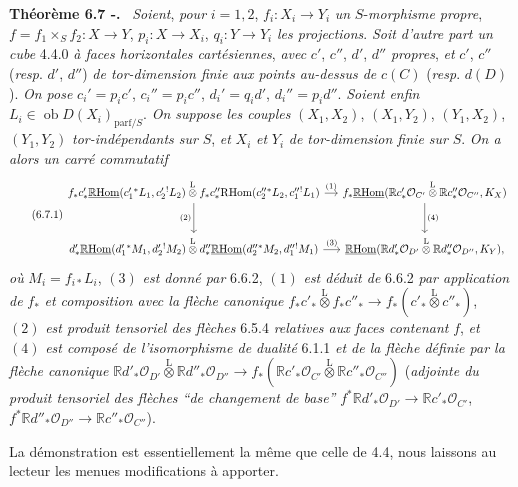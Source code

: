 \documentclass[11pt]{article}
\providecommand{\cO}{\mathcal{O}}
\newenvironment{statement}[1]{\par\medskip\noindent\textbf{#1.}\ }{\par\medskip}
\newcommand{\R}{\mathbb{R}}\newcommand{\RHomCore}{\mathbb{R}\mathrm{Hom}}
\providecommand{\RHom}{\RHomCore}
\providecommand{\uRHom}{\underline{\RHom}}
\providecommand{\RHom}{\RHomCore}
\providecommand{\RHom}{\R\mathcal{H}om}
\providecommand{\R}{\mathrm R}
\providecommand{\RHom}{\RHomCore}
\begin{document}
\begin{statement}{Théorème 6.7 -}
\emph{Soient}, \emph{pour} $i=1,2$, $f_i:X_i\to Y_i$ \emph{un} $S$-\emph{morphisme propre}, $f=f_1\times_Sf_2:X\to Y$, $p_i:X\to X_i$, $q_i:Y\to Y_i$ \emph{les projections}. \emph{Soit d'autre part un cube} 4.4.0 \emph{à faces horizontales cartésiennes}, \emph{avec} $c'$, $c''$, $d'$, $d''$ \emph{propres}, \emph{et} $c'$, $c''$ (\emph{resp}. $d'$, $d''$) \emph{de tor-dimension finie aux points au-dessus de} $c(C)$ (\emph{resp}. $d(D)$). \emph{On pose} $c_i'=p_ic'$, $c_i''=p_ic''$, $d_i'=q_id'$, $d_i''=p_id''$. \emph{Soient enfin} $L_i\in\operatorname{ob}D(X_i)_{\mathrm{parf}/S}$. \emph{On suppose les couples} $(X_1,X_2)$, $(X_1,Y_2)$, $(Y_1,X_2)$, $(Y_1,Y_2)$ \emph{tor-indépendants sur} $S$, \emph{et} $X_i$ \emph{et} $Y_i$ \emph{de tor-dimension finie sur} $S$. \emph{On a alors un carré commutatif}
\begin{equation}
\tag{6.7.1}
\begin{tikzcd}[column sep=small,row sep=large]
f_*c'_*\uRHom(c_1'{}^*L_1,c_2'{}^!L_2)\overset{\mathrm{L}}{\otimes} f_*c''_*\mathrm{R}\mathrm{Hom}(c_2''{}^*L_2,c_1''{}^!L_1) \arrow[r,"(1)"] \arrow[d,"(2)"']
& f_*\uRHom(\R c'_*\cO_{C'}\overset{\mathrm{L}}{\otimes}\R c''_*\cO_{C''},K_X) \arrow[d,"(4)"] \\
d'_*\uRHom(d_1'{}^*M_1,d_2'{}^!M_2)\overset{\mathrm{L}}{\otimes} d''_*\uRHom(d_2''{}^*M_2,d_1''{}^!M_1) \arrow[r,"(3)"]
& \uRHom(\R d'_*\cO_{D'}\overset{\mathrm{L}}{\otimes}\R d''_*\cO_{D''},K_Y),
\end{tikzcd}
\end{equation}
\emph{où} $M_i=f_{i*}L_i$, $(3)$ \emph{est donné par} 6.6.2, $(1)$ \emph{est déduit de} 6.6.2 \emph{par application de} $f_*$ \emph{et composition avec la flèche canonique} $f_*c'_*\overset{\mathrm{L}}{\otimes} f_*c''_*\to f_*(c'_*\overset{\mathrm{L}}{\otimes} c''_*)$, $(2)$ \emph{est produit tensoriel des flèches} 6.5.4 \emph{relatives aux faces contenant} $f$, \emph{et} $(4)$ \emph{est composé de l'isomorphisme de dualité} 6.1.1 \emph{et de la flèche définie par la flèche canonique} $\R d'_*\cO_{D'}\overset{\mathrm{L}}{\otimes}\R d''_*\cO_{D''}\longrightarrow f_*(\R c'_*\cO_{C'}\overset{\mathrm{L}}{\otimes}\R c''_*\cO_{C''})$ (\emph{adjointe du produit tensoriel des flèches ``de changement de base''} $f^*\R d'_*\cO_{D'}\to \R c'_*\cO_{C'}$, $f^*\R d''_*\cO_{D''}\to \R c''_*\cO_{C''}$).
\end{statement}

La démonstration est essentiellement la même que celle de 4.4, nous laissons au lecteur les menues modifications à apporter.
\end{document}
